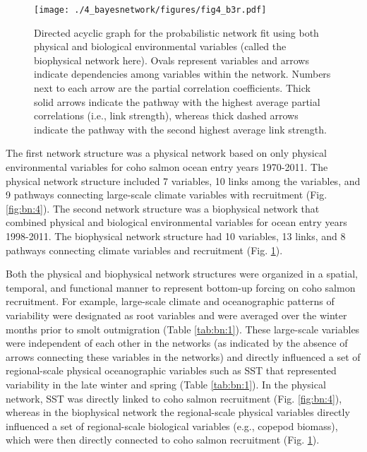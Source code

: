 \begin{figure}[htbp]
  \centering \texttt{[image: ./4\_bayesnetwork/figures/fig4\_b3r.pdf]}
  \caption[Directed acyclic graph for the probabilistic network fit using both
           physical and biological environmental variables.]{Directed acyclic
           graph for the probabilistic network fit using both physical and
           biological environmental variables (called the biophysical network
           here). Ovals represent variables and arrows indicate dependencies
           among variables within the network. Numbers next to each arrow are
           the partial correlation coefficients. Thick solid arrows indicate the
           pathway with the highest average partial correlations (i.e., link
           strength), whereas thick dashed arrows indicate the pathway with the
           second highest average link strength.}
  \label{fig:bn:5}
\end{figure}

The first network structure was a physical network based on only physical
environmental variables for coho salmon ocean entry years 1970-2011. The
physical network structure included 7 variables, 10 links among the variables,
and 9 pathways connecting large-scale climate variables with recruitment (Fig.
\ref{fig:bn:4}). The second network structure was a biophysical network that
combined physical and biological environmental variables for ocean entry years
1998-2011. The biophysical network structure had 10 variables, 13 links, and 8
pathways connecting climate variables and recruitment (Fig. \ref{fig:bn:5}).

Both the physical and biophysical network structures were organized in a
spatial, temporal, and functional manner to represent bottom-up forcing on coho
salmon recruitment. For example, large-scale climate and oceanographic patterns
of variability were designated as root variables and were averaged over the
winter months prior to smolt outmigration (Table \ref{tab:bn:1}). These
large-scale variables were independent of each other in the networks (as
indicated by the absence of arrows connecting these variables in the networks)
and directly influenced a set of regional-scale physical oceanographic variables
such as SST that represented variability in the late winter and spring (Table
\ref{tab:bn:1}). In the physical network, SST was directly linked to coho salmon
recruitment (Fig. \ref{fig:bn:4}), whereas in the biophysical network the
regional-scale physical variables directly influenced a set of regional-scale
biological variables (e.g., copepod biomass), which were then directly connected
to coho salmon recruitment (Fig. \ref{fig:bn:5}).


